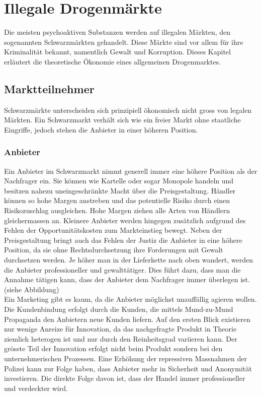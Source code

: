 \documentclass[../main.tex]{subfiles}
\begin{document}
 	\section{Illegale Drogenmärkte}
 	
 	Die meisten psychoaktiven Substanzen werden auf illegalen Märkten, den sogenannten Schwarzmärkten gehandelt.
	Diese Märkte sind vor allem für ihre Kriminalität bekannt, namentlich Gewalt und Korruption. 
	Dieses Kapitel erläutert die theoretische Ökonomie eines allgemeinen Drogenmarktes. 

	
	
	\subsection{Marktteilnehmer}
	Schwarzmärkte unterscheiden sich prinzipiell ökonomisch nicht gross von legalen Märkten.
	Ein Schwarzmarkt verhält sich wie ein freier Markt ohne staatliche Eingriffe, jedoch stehen die Anbieter in einer höheren Position.
	
	
	
	\subsubsection{Anbieter}	
	Ein Anbieter im Schwarzmarkt nimmt generell immer eine höhere Position als der Nachfrager ein.
	Sie können wie Kartelle oder sogar Monopole handeln und besitzen nahezu uneingeschränkte Macht über die Preisgestaltung.
	Händler können so hohe Margen anstreben und das potentielle Risiko durch einen Risikozuschlag ausgleichen.
	Hohe Margen ziehen alle Arten von Händlern gleichermassen an.
	Kleinere Anbieter werden hingegen zusätzlich aufgrund des Fehlen der Opportunitätskosten zum Markteinstieg bewegt.
	Neben der Preisgestaltung bringt auch das Fehlen der Justiz die Anbieter in eine höhere Position, da sie ohne Rechtsdurchsetzung ihre Forderungen mit Gewalt durchsetzen werden.
	Je höher man in der Lieferkette nach oben wandert, werden die Anbieter professioneller und gewalttätiger. 
	Dies führt dazu, dass man die Annahme tätigen kann, dass der Anbieter dem Nachfrager immer überlegen ist. (siehe Abbildung)\\
	
	
	\noindent
	Ein Marketing gibt es kaum, da die Anbieter möglichst unauffällig agieren wollen.
	Die Kundenbindung erfolgt durch die Kunden, die mittels Mund-zu-Mund Propaganda den Anbietern neue Kunden liefern.
	Auf den ersten Blick existieren nur wenige Anreize für Innovation, da das nachgefragte Produkt in Theorie ziemlich heterogen ist und nur durch den Reinheitsgrad variieren kann.		
	Der grösste Teil der Innovation erfolgt nicht beim Produkt sondern bei den unternehmerischen Prozessen. 
	Eine Erhöhung der repressiven Massnahmen der Polizei kann zur Folge haben, dass Anbieter mehr in Sicherheit und Anonymität investieren.
	Die direkte Folge davon ist, dass der Handel immer professioneller und verdeckter wird.
	
\end{document}
